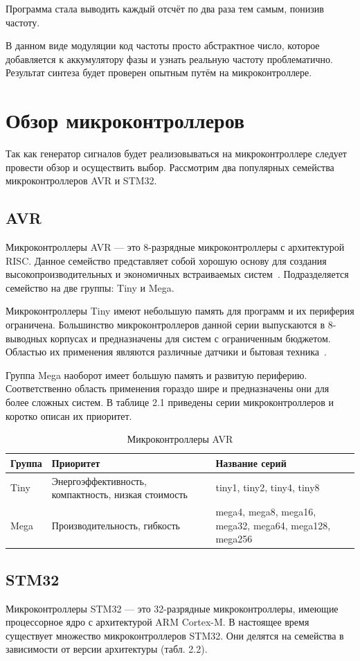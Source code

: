 	Программа стала выводить каждый отсчёт по два раза тем самым, понизив частоту.
	
	В данном виде модуляции код частоты просто абстрактное число, которое добавляется к аккумулятору фазы и узнать реальную частоту проблематично. Результат синтеза будет проверен опытным путём на микроконтроллере.
	
\section{Обзор микроконтроллеров}
	Так как генератор сигналов будет реализовываться на микроконтроллере следует провести обзор и осуществить выбор. Рассмотрим два популярных семейства микроконтроллеров AVR и STM32.
\subsection{AVR}
	Микроконтроллеры AVR --- это 8-разрядные микроконтроллеры с архитектурой RISC. Данное семейство представляет собой хорошую основу для создания высокопроизводительных и экономичных встраиваемых систем~\cite{avrstm}. Подразделяется семейство на две группы: Tiny и Mega.
	
	Микроконтроллеры Tiny имеют небольшую память для программ и их периферия ограничена. Большинство микроконтроллеров данной серии выпускаются в 8-выводных корпусах и предназначены для систем с ограниченным бюджетом. Областью их применения являются различные датчики и бытовая техника~\cite{avr}.
	
	Группа Mega наоборот имеет большую память и развитую периферию. Соответственно область применения гораздо шире и предназначены они для более сложных систем. В таблице 2.1 приведены серии микроконтроллеров и коротко описан их приоритет.

\begin{table}[H]
\caption{Микроконтроллеры AVR}
\begin{tabular}{|p{3.25 cm}|p{8 cm}|p{4 cm}|}
\hline
Группа & Приоритет & Название серий \\ \hline
Tiny & Энергоэффективность, компактность, низкая стоимость & tiny1, tiny2, tiny4, tiny8 \\ \hline
Mega & Производительность, гибкость & mega4, mega8, mega16, mega32, mega64, mega128, mega256 \\ \hline
\end{tabular}
\end{table}

\subsection{STM32}
	Микроконтроллеры STM32 --- это 32-разрядные микроконтроллеры, имеющие процессорное ядро с архитектурой ARM Cortex-M. В настоящее время существует множество микроконтроллеров STM32. Они делятся на семейства в зависимости от версии архитектуры (табл. 2.2).

